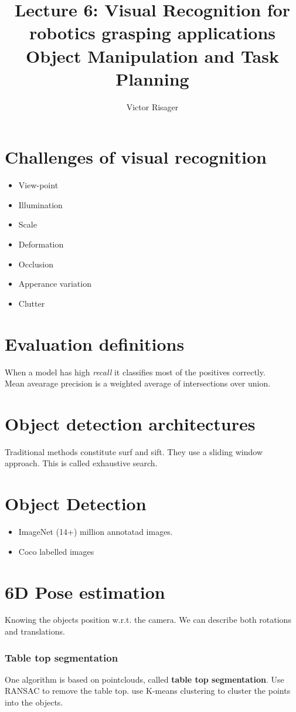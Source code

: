\documentclass[a4paper]{article}
\title{Lecture 6: Visual Recognition for robotics grasping applications  \\
	\large Object Manipulation and Task Planning}
\author{Victor Risager}
\begin{document}
\maketitle
\section{Challenges of visual recognition}

\begin{itemize}
	\item View-point
	\item Illumination
	\item Scale
	\item Deformation
	\item Occlusion
	\item Apperance variation
	\item Clutter
\end{itemize}

\section{Evaluation definitions}
When a model has high \textit{recall} it classifies most of the positives correctly. \\ 
Mean avearage precision is a weighted average of intersections over union.

\section{Object detection architectures}
Traditional methods constitute surf and sift. They use a sliding window approach. This is called exhaustive search. 

\section{Object Detection}
\begin{itemize}
	\item ImageNet (14+) million annotatad images. 
	\item Coco labelled images
\end{itemize}

\section{6D Pose estimation}
Knowing the objects position w.r.t. the camera. We can describe both rotations and translations.
\subsubsection{Table top segmentation}
One algorithm is based on pointclouds, called \textbf{table top segmentation}. Use RANSAC to remove the table top. use K-means clustering to cluster the points into the objects. 
\end{document}
